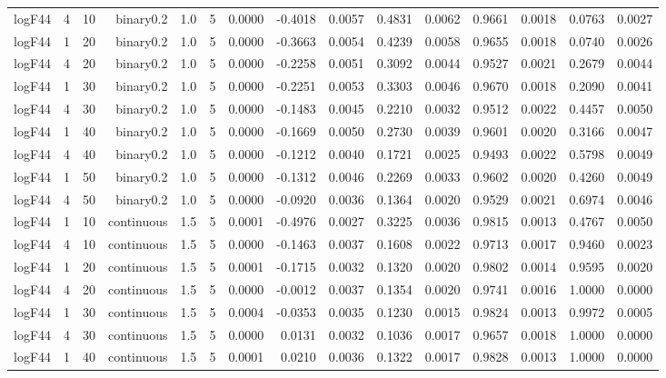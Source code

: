 \begin{longtable}{rrrrrrrrrrrrrrr}
  logF44 & 4 & 10 & binary0.2 & 1.0 & 5 & 0.0000 & -0.4018 & 0.0057 & 0.4831 & 0.0062 & 0.9661 & 0.0018 & 0.0763 & 0.0027 \\ 
  logF44 & 1 & 20 & binary0.2 & 1.0 & 5 & 0.0000 & -0.3663 & 0.0054 & 0.4239 & 0.0058 & 0.9655 & 0.0018 & 0.0740 & 0.0026 \\ 
  logF44 & 4 & 20 & binary0.2 & 1.0 & 5 & 0.0000 & -0.2258 & 0.0051 & 0.3092 & 0.0044 & 0.9527 & 0.0021 & 0.2679 & 0.0044 \\ 
  logF44 & 1 & 30 & binary0.2 & 1.0 & 5 & 0.0000 & -0.2251 & 0.0053 & 0.3303 & 0.0046 & 0.9670 & 0.0018 & 0.2090 & 0.0041 \\ 
  logF44 & 4 & 30 & binary0.2 & 1.0 & 5 & 0.0000 & -0.1483 & 0.0045 & 0.2210 & 0.0032 & 0.9512 & 0.0022 & 0.4457 & 0.0050 \\ 
  logF44 & 1 & 40 & binary0.2 & 1.0 & 5 & 0.0000 & -0.1669 & 0.0050 & 0.2730 & 0.0039 & 0.9601 & 0.0020 & 0.3166 & 0.0047 \\ 
  logF44 & 4 & 40 & binary0.2 & 1.0 & 5 & 0.0000 & -0.1212 & 0.0040 & 0.1721 & 0.0025 & 0.9493 & 0.0022 & 0.5798 & 0.0049 \\ 
  logF44 & 1 & 50 & binary0.2 & 1.0 & 5 & 0.0000 & -0.1312 & 0.0046 & 0.2269 & 0.0033 & 0.9602 & 0.0020 & 0.4260 & 0.0049 \\ 
  logF44 & 4 & 50 & binary0.2 & 1.0 & 5 & 0.0000 & -0.0920 & 0.0036 & 0.1364 & 0.0020 & 0.9529 & 0.0021 & 0.6974 & 0.0046 \\ 
  logF44 & 1 & 10 & continuous & 1.5 & 5 & 0.0001 & -0.4976 & 0.0027 & 0.3225 & 0.0036 & 0.9815 & 0.0013 & 0.4767 & 0.0050 \\ 
  logF44 & 4 & 10 & continuous & 1.5 & 5 & 0.0000 & -0.1463 & 0.0037 & 0.1608 & 0.0022 & 0.9713 & 0.0017 & 0.9460 & 0.0023 \\ 
  logF44 & 1 & 20 & continuous & 1.5 & 5 & 0.0001 & -0.1715 & 0.0032 & 0.1320 & 0.0020 & 0.9802 & 0.0014 & 0.9595 & 0.0020 \\ 
  logF44 & 4 & 20 & continuous & 1.5 & 5 & 0.0000 & -0.0012 & 0.0037 & 0.1354 & 0.0020 & 0.9741 & 0.0016 & 1.0000 & 0.0000 \\ 
  logF44 & 1 & 30 & continuous & 1.5 & 5 & 0.0004 & -0.0353 & 0.0035 & 0.1230 & 0.0015 & 0.9824 & 0.0013 & 0.9972 & 0.0005 \\ 
  logF44 & 4 & 30 & continuous & 1.5 & 5 & 0.0000 & 0.0131 & 0.0032 & 0.1036 & 0.0017 & 0.9657 & 0.0018 & 1.0000 & 0.0000 \\ 
  logF44 & 1 & 40 & continuous & 1.5 & 5 & 0.0001 & 0.0210 & 0.0036 & 0.1322 & 0.0017 & 0.9828 & 0.0013 & 1.0000 & 0.0000 \\ 

\end{longtable}
